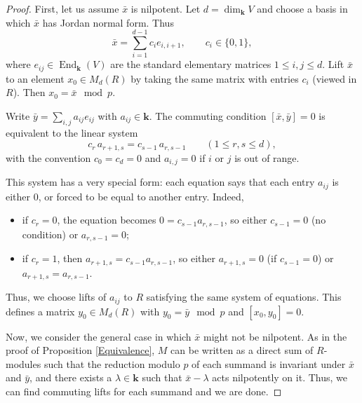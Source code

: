 \documentclass[12pt,letterpaper]{amsart}
\theoremstyle{plain}
\theoremstyle{definition}
\DeclareMathOperator{\End}{End}
\begin{document}
\begin{proof}
First, let us assume $\bar x$ is nilpotent. Let $d=\dim_{\mathbf{k}}V$ and choose a basis in which $\bar x$ has Jordan normal form. Thus
\[
\bar x = \sum_{i=1}^{d-1} c_i e_{i,i+1},\qquad c_i\in\{0,1\},
\]
where $e_{ij}\in \End_{\mathbf{k}}(V)$  are the standard elementary matrices $1\leq i, j\leq d$. 
Lift $\bar x$ to an element $x_0\in M_d(R)$ by taking the same matrix with entries $c_i$ (viewed in $R$). Then $x_0=\bar x\mod p$.

Write $\bar y=\sum_{i,j} a_{ij}e_{ij}$ with $a_{ij}\in\mathbf{k}$. The commuting condition $[\bar x,\bar y]=0$ is equivalent to the linear system
\[
c_r\, a_{r+1,s} = c_{s-1}\, a_{r,s-1}\qquad (1\le r,s\le d),
\]
with the convention $c_0=c_d=0$ and $a_{i,j}=0$ if $i$ or $j$ is out of range.

This system has a very special form: each equation says that each entry $a_{ij}$ is either $0$, or forced to be equal to another entry. Indeed,

\begin{itemize}
\item if $c_r=0$, the equation becomes $0=c_{s-1} a_{r,s-1}$, so either $c_{s-1}=0$ (no condition) or $a_{r,s-1}=0$;
\item if $c_r=1$, then $a_{r+1,s}=c_{s-1} a_{r,s-1}$, so either $a_{r+1,s}=0$ (if $c_{s-1}=0$) or $a_{r+1,s}=a_{r,s-1}$.
\end{itemize}
Thus, we choose lifts of $a_{ij}$  to $R$ satisfying the same system of equations. This defines a matrix $y_0\in M_d(R)$ with $y_0=\bar y\mod p$ and  $[x_0,y_0]=0$.


Now, we consider the general case in which $\bar x$ might not be nilpotent. As in the proof of Proposition \ref{Equivalence}, $M$ can be written as a direct sum of $R$-modules such that the reduction modulo $p$ of each summand is invariant under $\bar x$ and $\bar y$, and there exists a $\lambda\in\mathbf{k}$ such that $\bar x-\lambda$ acts nilpotently on it. Thus, we can find commuting lifts for each summand and we are done.

\end{proof}
\end{document}
